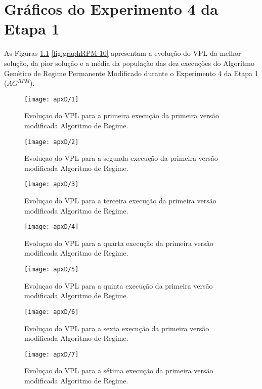 
\chapter{Gráficos do Experimento 4 da Etapa 1}

As Figuras \ref{fig:graphRPM-01}-\ref{fig:graphRPM-10} apresentam a evolução do VPL da melhor solução, da pior solução e a média da população das dez execuções do Algoritmo Genético de Regime Permanente Modificado durante o Experimento 4 da Etapa 1 ($AG^{RPM}$).

\begin{figure}[H]
\centering
\texttt{[image: apxD/1]}
\caption{Evoluçao do VPL para a primeira execução da primeira versão modificada  Algoritmo de Regime.}
\label{fig:graphRPM-01}
\end{figure}

\begin{figure}[H]
\centering
\texttt{[image: apxD/2]}
\caption{Evoluçao do VPL para a segunda execução da primeira versão modificada  Algoritmo de Regime.}
\label{fig:graphRPM-02}
\end{figure}

\begin{figure}[H]
\centering
\texttt{[image: apxD/3]}
\caption{Evoluçao do VPL para a terceira execução da primeira versão modificada  Algoritmo de Regime.}
\label{fig:graphRPM-03}
\end{figure}

\begin{figure}[H]
\centering
\texttt{[image: apxD/4]}
\caption{Evoluçao do VPL para a quarta execução da primeira versão modificada  Algoritmo de Regime.}
\label{fig:graphRPM-04}
\end{figure}

\begin{figure}[H]
\centering
\texttt{[image: apxD/5]}
\caption{Evoluçao do VPL para a quinta execução da primeira versão modificada  Algoritmo de Regime.}
\label{fig:graphRPM-05}
\end{figure}

\begin{figure}[H]
\centering
\texttt{[image: apxD/6]}
\caption{Evoluçao do VPL para a sexta execução da primeira versão modificada  Algoritmo de Regime.}
\label{fig:graphRPM-06}
\end{figure}

\begin{figure}[H]
\centering
\texttt{[image: apxD/7]}
\caption{Evoluçao do VPL para a sétima execução da primeira versão modificada  Algoritmo de Regime.}
\label{fig:graphRPM-07}
\end{figure}

